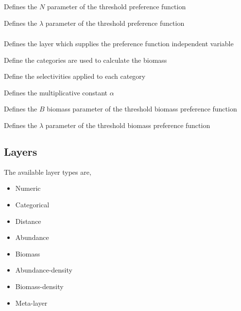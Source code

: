  {Defines the $N$ parameter of the threshold preference function}

 {Defines the $\lambda$ parameter of the threshold preference function}

\subsubsection[Threshold-biomass]{}

 {Defines the layer which supplies the preference function independent variable}

 {Define the categories are used to calculate the biomass}

 {Define the selectivities applied to each category}


 {Defines the multiplicative constant $\alpha$}

 {Defines the $B$ biomass parameter of the threshold biomass preference function}

 {Defines the $\lambda$ parameter of the threshold biomass preference function}

\subsection{Layers}

The available layer types  are, 

\begin{itemize}
	\item Numeric
	\item Categorical
	\item Distance
	\item Abundance
	\item Biomass
	\item Abundance-density
	\item Biomass-density
	\item Meta-layer
\end{itemize}

